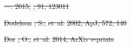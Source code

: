 \documentclass[numberedappendix]{emulateapj}
\providecommand{\DIFdel}[1]{{\protect\color{red}\sout{#1}}}                      %
\begin{document}
\DIFdel{---. 2015, }%
\DIFdel{, 91, 123011
}%

\DIFdel{Dodelson}%
\DIFdel{, S., }%
\DIFdel{et~al.}%
\DIFdel{2002, ApJ, 572, 140
}%

\DIFdel{Dor}%
\DIFdel{, O., }%
\DIFdel{et~al.}%
\DIFdel{2014, ArXiv e-prints
}%
\end{document}
